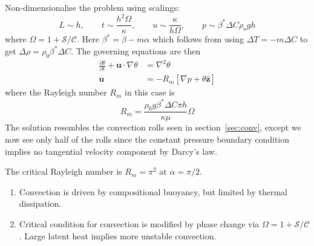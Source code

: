 \documentclass{jknotes}
\renewcommand{\u}{\symbf{u}}
\newcommand{\C}{\mathcal{C}}
\renewcommand{\S}{\mathcal{S}}
\begin{document}
Non-dimensionalise the problem using scalings:
\begin{equation}
	L \sim h, \hspace{2em} t \sim \frac{h^2 \Omega}{\kappa},\hspace{2em} u \sim
	\frac{\kappa}{h\Omega},\hspace{2em} p \sim \beta^* \Delta C \rho_o g h
\end{equation}
where $\Omega = 1 + \S/\C$. Here $\beta^* = \beta-m\alpha$ which follows from
using $\Delta T = -m\Delta C$ to get $\Delta \rho = \rho_0 \beta^* \Delta C$. The
governing equations are then
\begin{align}
	\frac{\partial \theta}{\partial t} + \u \cdot \nabla \theta &= \nabla^2
	\theta \\
	\u &= -R_m \left[ \nabla p + \theta \hat{\symbf{z}}\right] 
\end{align}
where the Rayleigh number $R_m$ in this case is
\begin{equation}
	R_m = \frac{\rho_0 g \beta^* \Delta C \pi h}{\kappa \mu} \Omega
\end{equation}
The solution resembles the convection rolls seen in section~\ref{sec:conv},
except we now see only half of the rolls since the constant pressure boundary
condition implies no tangential velocity component by Darcy's law.

\begin{center}
\end{center}

The critical Rayleigh number is $R_m = \pi^2$ at $\alpha = \pi/2$.
\begin{enumerate}
	\item Convection is driven by compositional buoyancy, but limited by
		thermal dissipation.
	\item Critical condition for convection is modified by phase change via
		$\Omega = 1+\S/\C$. Large latent heat implies more unstable
		convection.
\end{enumerate}
\end{document}
